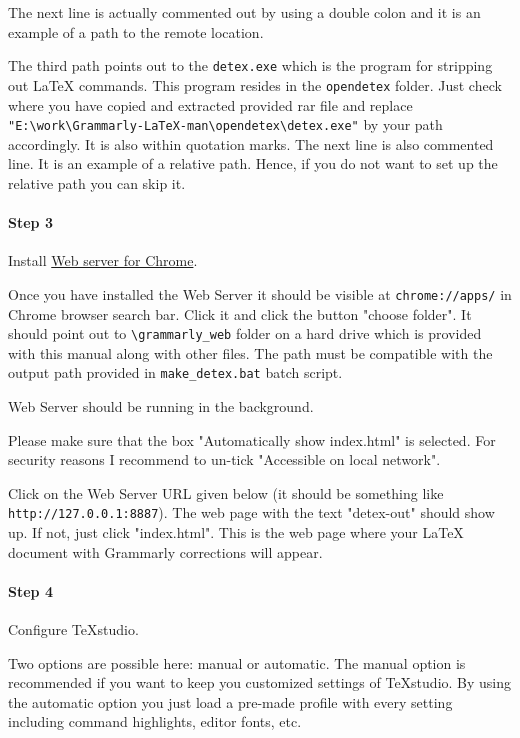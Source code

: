 \documentclass[]{spie}  %
\begin{document}
The next line is actually commented out by using a double colon and it is an example of a path to the remote location.

The third path points out to the \verb|detex.exe| which is the program for stripping out LaTeX commands. This program resides in the \verb|opendetex| folder. Just check where you have copied and extracted provided rar file and replace \verb|"E:\work\Grammarly-LaTeX-man\opendetex\detex.exe"| by your path accordingly. It is also within quotation marks.
The next line is also commented line. 
It is an example of a relative path. Hence, if you do not want to set up the relative path you can skip it.

\paragraph{Step 3} Install \href{https://chrome.google.com/webstore/detail/web-server-for-chrome/ofhbbkphhbklhfoeikjpcbhemlocgigb}{Web server for Chrome}. 

Once you have installed the Web Server it should be visible at \verb|chrome://apps/| in Chrome browser search bar. Click it and click the button "choose folder". It should point out to \verb|\grammarly_web| folder on a hard drive which is provided with this manual along with other files. 
The path must be compatible with the output path provided in \verb|make_detex.bat| batch script. 

Web Server should be running in the background.

Please make sure that the box "Automatically show index.html" is selected. 
For security reasons I recommend to un-tick "Accessible on local network".  

Click on the Web Server URL given below (it should be something like \verb|http://127.0.0.1:8887|). 
The web page with the text "detex-out" should show up. 
If not, just click "index.html".
This is the web page where your LaTeX document with Grammarly corrections will appear.


\paragraph{Step 4} Configure TeXstudio.

Two options are possible here: manual or automatic. 
The manual option is recommended if you want to keep you customized settings of TeXstudio. By using the automatic option you just load a pre-made profile with every setting including command highlights, editor fonts, etc.
\end{document}
